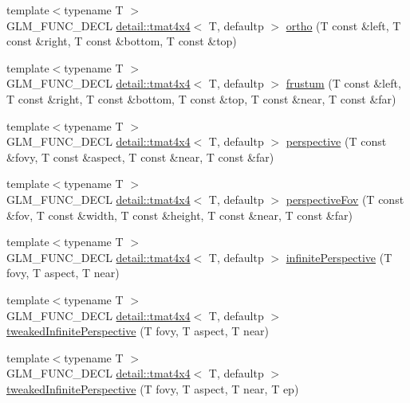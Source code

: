 \begin{DoxyCompactItemize}
\item 
{\footnotesize template$<$typename T $>$ }\\G\+L\+M\+\_\+\+F\+U\+N\+C\+\_\+\+D\+E\+CL \hyperlink{structglm_1_1detail_1_1tmat4x4}{detail\+::tmat4x4}$<$ T, defaultp $>$ \hyperlink{group__gtc__matrix__transform_gab03587bce3510aa5d2f4e5f1be6c2370}{ortho} (T const \&left, T const \&right, T const \&bottom, T const \&top)
\item 
{\footnotesize template$<$typename T $>$ }\\G\+L\+M\+\_\+\+F\+U\+N\+C\+\_\+\+D\+E\+CL \hyperlink{structglm_1_1detail_1_1tmat4x4}{detail\+::tmat4x4}$<$ T, defaultp $>$ \hyperlink{group__gtc__matrix__transform_ga486d3d6819c04880559f3dccd38f9f58}{frustum} (T const \&left, T const \&right, T const \&bottom, T const \&top, T const \&near, T const \&far)
\item 
{\footnotesize template$<$typename T $>$ }\\G\+L\+M\+\_\+\+F\+U\+N\+C\+\_\+\+D\+E\+CL \hyperlink{structglm_1_1detail_1_1tmat4x4}{detail\+::tmat4x4}$<$ T, defaultp $>$ \hyperlink{group__gtc__matrix__transform_ga6c82aa0ea748cfbb16887d81cf6c5a10}{perspective} (T const \&fovy, T const \&aspect, T const \&near, T const \&far)
\item 
{\footnotesize template$<$typename T $>$ }\\G\+L\+M\+\_\+\+F\+U\+N\+C\+\_\+\+D\+E\+CL \hyperlink{structglm_1_1detail_1_1tmat4x4}{detail\+::tmat4x4}$<$ T, defaultp $>$ \hyperlink{group__gtc__matrix__transform_gac00bf68d4f7ec62380b84c5354567f71}{perspective\+Fov} (T const \&fov, T const \&width, T const \&height, T const \&near, T const \&far)
\item 
{\footnotesize template$<$typename T $>$ }\\G\+L\+M\+\_\+\+F\+U\+N\+C\+\_\+\+D\+E\+CL \hyperlink{structglm_1_1detail_1_1tmat4x4}{detail\+::tmat4x4}$<$ T, defaultp $>$ \hyperlink{group__gtc__matrix__transform_ga63ba1ddb9c4a08d4e58becd0dc5b725a}{infinite\+Perspective} (T fovy, T aspect, T near)
\item 
{\footnotesize template$<$typename T $>$ }\\G\+L\+M\+\_\+\+F\+U\+N\+C\+\_\+\+D\+E\+CL \hyperlink{structglm_1_1detail_1_1tmat4x4}{detail\+::tmat4x4}$<$ T, defaultp $>$ \hyperlink{group__gtc__matrix__transform_ga9d67732836d71a79dc21eb8f87603cb7}{tweaked\+Infinite\+Perspective} (T fovy, T aspect, T near)
\item 
{\footnotesize template$<$typename T $>$ }\\G\+L\+M\+\_\+\+F\+U\+N\+C\+\_\+\+D\+E\+CL \hyperlink{structglm_1_1detail_1_1tmat4x4}{detail\+::tmat4x4}$<$ T, defaultp $>$ \hyperlink{group__gtc__matrix__transform_gade8abc58c0ac541163e872eb66f3e5de}{tweaked\+Infinite\+Perspective} (T fovy, T aspect, T near, T ep)

\end{DoxyCompactItemize}
